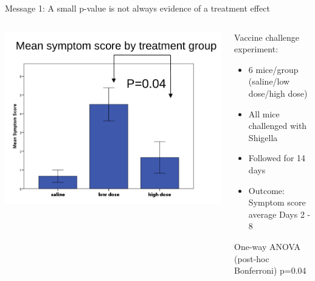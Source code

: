 \documentclass[10pt]{beamer}
\begin{document}
\begin{frame}{Message 1: A small p-value is not always evidence of a treatment effect}

  \begin{columns}
    \begin{column}{0.5\textwidth}
	\begin{center}
	\includegraphics[width=\textwidth]{Figures/message1}
	\end{center}
    \end{column}
    
    \begin{column}{0.5\textwidth}
    \begin{block}{Vaccine challenge experiment:}
      \begin{itemize} 
       \item 6 mice/group (saline/low dose/high dose)
       \item All mice challenged with Shigella
       \item Followed for 14 days
       \item  Outcome: Symptom score average Days 2 - 8
      \end{itemize}
      \end{block}
      
      \begin{alertblock}{}
       One-way ANOVA (post-hoc Bonferroni) p=0.04
      \end{alertblock}

    \end{column}
  \end{columns}
  

\end{frame}
\end{document}
